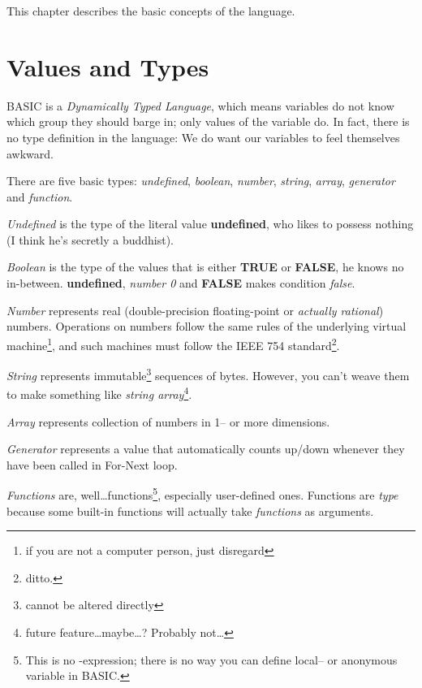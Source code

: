 This chapter describes the basic concepts of the language.


\section{Values and Types}

BASIC is a \emph{Dynamically Typed Language}, which means variables do not know which group they should barge in; only values of the variable do. In fact, there is no type definition in the language: We do want our variables to feel themselves awkward.

There are five basic types: \emph{undefined}, \emph{boolean}, \emph{number}, \emph{string},  \emph{array}, \emph{generator} and \emph{function}.

\emph{Undefined} is the type of the literal value \textbf{undefined}, who likes to possess nothing (I think he's secretly a buddhist).

\emph{Boolean} is the type of the values that is either \textbf{TRUE} or \textbf{FALSE}, he knows no in-between. \textbf{undefined}, \emph{number 0} and \textbf{FALSE} makes condition \emph{false}. 

\emph{Number} represents real (double-precision floating-point or \emph{actually rational}) numbers. Operations on numbers follow the same rules of the underlying virtual machine\footnote{if you are not a computer person, just disregard}, and such machines must follow the IEEE 754 standard\footnote{ditto.}. 

\emph{String} represents immutable\footnote{cannot be altered directly} sequences of bytes. However, you can't weave them to make something like \emph{string array}\footnote{future feature\ldots maybe\ldots? Probably not\ldots}.

\emph{Array} represents collection of numbers in 1-- or more dimensions.

\emph{Generator} represents a value that automatically counts up/down whenever they have been called in For-Next loop.

\emph{Functions} are, well\ldots functions\footnote{This is no {\lambda}-expression; there is no way you can define local-- or anonymous variable in BASIC.}, especially user-defined ones. Functions are \emph{type} because some built-in functions will actually take \emph{functions} as arguments.

